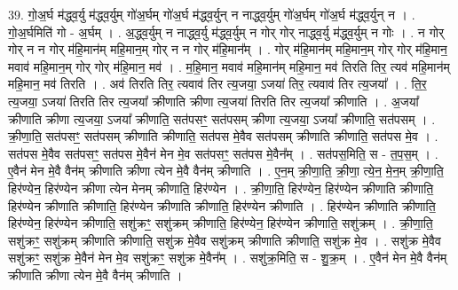 \documentclass[17pt]{extarticle}
\begin{document}
39. गो॒अ॒र्घ म॑द्ध्व॒र्यु म॑द्ध्व॒र्युम् गो॑अ॒र्घम् गो॑अ॒र्घ म॑द्ध्व॒र्युन् न नाद्ध्व॒र्युम् गो॑अ॒र्घम् गो॑अ॒र्घ म॑द्ध्व॒र्युन् न । . गो॒अ॒र्घमिति॑ गो - अ॒र्घम् । . अ॒द्ध्व॒र्युम् न नाद्ध्व॒र्यु म॑द्ध्व॒र्युम् न गोर् गोर् नाद्ध्व॒र्यु म॑द्ध्व॒र्युम् न गोः । . न गोर् गोर् न न गोर् म॑हि॒मान॑म् महि॒मान॒म् गोर् न न गोर् म॑हि॒मान᳚म् । . गोर् म॑हि॒मान॑म् महि॒मान॒म् गोर् गोर् म॑हि॒मान॒ मवाव॑ महि॒मान॒म् गोर् गोर् म॑हि॒मान॒ मव॑ । . म॒हि॒मान॒ मवाव॑ महि॒मान॑म् महि॒मान॒ मव॑ तिरति तिर॒ त्यव॑ महि॒मान॑म् महि॒मान॒ मव॑ तिरति । . अव॑ तिरति तिर॒ त्यवाव॑ तिर त्य॒जया॒ ऽजया॑ तिर॒ त्यवाव॑ तिर त्य॒जया᳚ । . ति॒र॒ त्य॒जया॒ ऽजया॑ तिरति तिर त्य॒जया᳚ क्रीणाति क्रीणा त्य॒जया॑ तिरति तिर त्य॒जया᳚ क्रीणाति । . अ॒जया᳚ क्रीणाति क्रीणा त्य॒जया॒ ऽजया᳚ क्रीणाति॒ सत॑पसꣳ॒॒ सत॑पसम् क्रीणा त्य॒जया॒ ऽजया᳚ क्रीणाति॒ सत॑पसम् । . क्री॒णा॒ति॒ सत॑पसꣳ॒॒ सत॑पसम् क्रीणाति क्रीणाति॒ सत॑पस मे॒वैव सत॑पसम् क्रीणाति क्रीणाति॒ सत॑पस मे॒व । . सत॑पस मे॒वैव सत॑पसꣳ॒॒ सत॑पस मे॒वैन॑ मेन मे॒व सत॑पसꣳ॒॒ सत॑पस मे॒वैन᳚म् । . सत॑पस॒मिति॒ स - त॒प॒स॒म् । . ए॒वैन॑ मेन मे॒वै वैन॑म् क्रीणाति क्रीणा त्येन मे॒वै वैन॑म् क्रीणाति । . ए॒न॒म् क्री॒णा॒ति॒ क्री॒णा॒ त्ये॒न॒ मे॒न॒म् क्री॒णा॒ति॒ हिर॑ण्येन॒ हिर॑ण्येन क्रीणा त्येन मेनम् क्रीणाति॒ हिर॑ण्येन । . क्री॒णा॒ति॒ हिर॑ण्येन॒ हिर॑ण्येन क्रीणाति क्रीणाति॒ हिर॑ण्येन क्रीणाति क्रीणाति॒ हिर॑ण्येन क्रीणाति क्रीणाति॒ हिर॑ण्येन क्रीणाति । . हिर॑ण्येन क्रीणाति क्रीणाति॒ हिर॑ण्येन॒ हिर॑ण्येन क्रीणाति॒ सशु॑क्रꣳ॒॒ सशु॑क्रम् क्रीणाति॒ हिर॑ण्येन॒ हिर॑ण्येन क्रीणाति॒ सशु॑क्रम् । . क्री॒णा॒ति॒ सशु॑क्रꣳ॒॒ सशु॑क्रम् क्रीणाति क्रीणाति॒ सशु॑क्र मे॒वैव सशु॑क्रम् क्रीणाति क्रीणाति॒ सशु॑क्र मे॒व । . सशु॑क्र मे॒वैव सशु॑क्रꣳ॒॒ सशु॑क्र मे॒वैन॑ मेन मे॒व सशु॑क्रꣳ॒॒ सशु॑क्र मे॒वैन᳚म् । . सशु॑क्र॒मिति॒ स - शु॒क्र॒म् । . ए॒वैन॑ मेन मे॒वै वैन॑म् क्रीणाति क्रीणा त्येन मे॒वै वैन॑म् क्रीणाति । \newline
\pagebreak
{}
\end{document}
